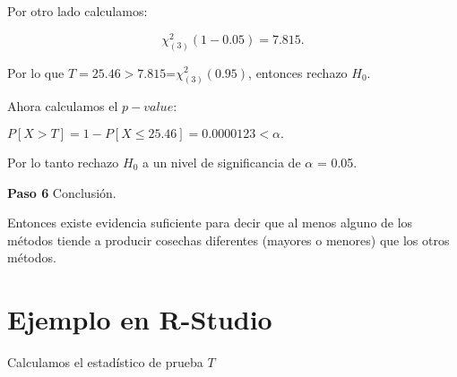 \documentclass[
  a4paper,
  oneside,
  openany]{book}
\begin{document}
Por otro lado calculamos:

\[\chi_{(3)}^2(1-0.05)=7.815.\]

Por lo que \(T=25.46 > 7.815\)=\(\chi_{(3)}^2(0.95)\), entonces rechazo \(H_0\).

Ahora calculamos el \(p-value\):

\(P[X>T]= 1-P[X\leq 25.46]=0.0000123 < \alpha.\)

Por lo tanto rechazo \(H_0\) a un nivel de significancia de \(\alpha\) = 0.05.

\textbf{Paso 6} Conclusión.

Entonces existe evidencia suficiente para decir que al menos alguno de los métodos tiende a producir cosechas diferentes (mayores o menores) que los otros métodos.

\hypertarget{ejemplo-en-r-studio-6}{%
\section{Ejemplo en R-Studio}\label{ejemplo-en-r-studio-6}}

Calculamos el estadístico de prueba \(T\)
\end{document}
